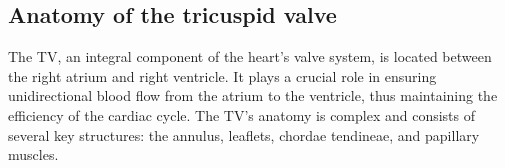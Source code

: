 \subsection{Anatomy of the tricuspid valve}
The \gls{TV}, an integral component of the heart's valve system, is located between the right atrium and right ventricle. It plays a crucial role in ensuring unidirectional blood flow from the atrium to the ventricle, thus maintaining the efficiency of the cardiac cycle. The \gls{TV}'s anatomy is complex and consists of several key structures: the annulus, leaflets, chordae tendineae, and papillary muscles.

